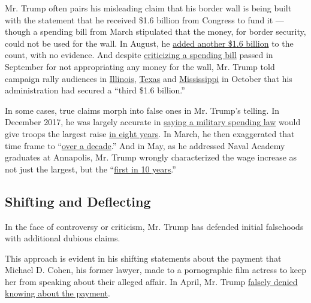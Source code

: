 Mr. Trump often pairs his misleading claim that his border wall is being
built with the statement that he received \$1.6 billion from Congress to
fund it --- though a spending bill from March stipulated that the money,
for border security, could not be used for the wall. In August, he
\href{https://www.youtube.com/watch?v=izMFU8g6uBo}{added another \$1.6
billion} to the count, with no evidence. And despite
\href{https://twitter.com/realDonaldTrump/status/1042740913968164864}{criticizing
a spending bill} passed in September for not appropriating any money for
the wall, Mr. Trump told campaign rally audiences in
\href{https://www.c-span.org/video/?453628-1/president-trump-campaigns-republicans-illinois\&start=1920}{Illinois},
\href{https://www.c-span.org/video/?453256-1/president-trump-campaigns-senator-ted-cruz-houston\&start=1526}{Texas}
and
\href{https://www.c-span.org/video/?452371-1/president-trump-holds-rally-mississippi\&start=2935}{Mississippi}
in October that his administration had secured a ``third \$1.6
billion.''

In some cases, true claims morph into false ones in Mr. Trump's telling.
In December 2017, he was largely accurate in
\href{https://www.whitehouse.gov/briefings-statements/remarks-president-trump-marine-helicopter-squadron-one/}{saying
a military spending law} would give troops the largest raise
\href{https://fas.org/sgp/crs/natsec/IF10260.pdf\#page=2}{in eight
years}. In March, he then exaggerated that time frame to
``\href{https://www.nytimes.com/2018/03/23/us/politics/fact-check-military-pay-immigrants.html}{over
a decade}.'' And in May, as he addressed Naval Academy graduates at
Annapolis, Mr. Trump wrongly characterized the wage increase as not just
the largest, but the
``\href{https://www.nytimes.com/2018/05/25/us/politics/fact-check-trump-naval-academy-speech.html}{first
in 10 years}.''

\hypertarget{shifting-and-deflecting}{%
\subsection{Shifting and Deflecting}\label{shifting-and-deflecting}}

In the face of controversy or criticism, Mr. Trump has defended initial
falsehoods with additional dubious claims.

This approach is evident in his shifting statements about the payment
that Michael D. Cohen, his former lawyer, made to a pornographic film
actress to keep her from speaking about their alleged affair. In April,
Mr. Trump
\href{https://www.whitehouse.gov/briefings-statements/remarks-president-trump-press-gaggle-en-route-washington-d-c/}{falsely
denied knowing about the payment}.

